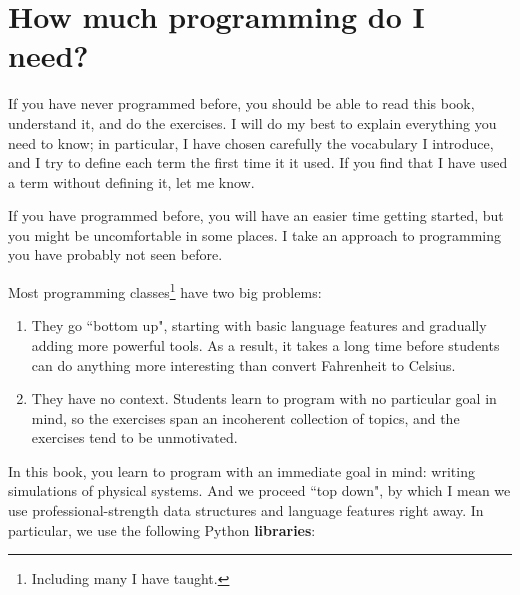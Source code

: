 \documentclass[12pt]{book}
\theoremstyle{exercise}
\begin{document}
\section*{How much programming do I need?}

If you have never programmed before, you should be able to read this book, understand it, and do the exercises.  I will do my best to explain everything you need to know; in particular, I have chosen carefully the vocabulary I introduce, and I try to define each term the first time it it used.  If you find that I have used a term without defining it, let me know.

If you have programmed before, you will have an easier time getting started, but you might be uncomfortable in some places.  I take an approach to programming you have probably not seen before.

Most programming classes\footnote{Including many I have taught.} have two big problems:

\begin{enumerate}

\item They go ``bottom up", starting with basic language features and gradually adding more powerful tools.  As a result, it takes a long time before students can do anything more interesting than convert Fahrenheit to Celsius.


\item They have no context.  Students learn to program with no particular goal in mind, so the exercises span an incoherent collection of topics, and the exercises tend to be unmotivated.

\end{enumerate}

In this book, you learn to program with an immediate goal in mind: writing simulations of physical systems.  And we proceed ``top down", by which I mean we use professional-strength data structures and language features right away.  In particular, we use the following Python {\bf libraries}:

\end{document}
